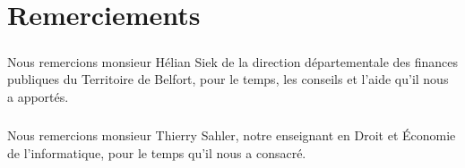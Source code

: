 \chapter*{Remerciements}

\paragraph{}
    Nous remercions monsieur Hélian Siek de la direction départementale des
    finances publiques du Territoire de Belfort, pour le temps, les conseils et l'aide qu'il nous a apportés.

\paragraph{}
    Nous remercions monsieur Thierry Sahler, notre enseignant en Droit et Économie de l'informatique, pour le temps qu'il nous a consacré.
